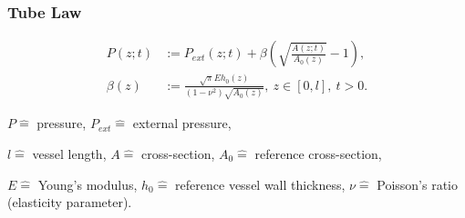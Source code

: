 \documentclass{beamer}
\begin{document}
\begin{frame}
	\frametitle{Tube Law}
	\begin{align}
		P(z;t) &:= P_{ext}(z;t) + \beta \left( \sqrt{\frac{A(z;t)}{A_0(z)}}-1 \right),      \label{eq:p_tot}\\
		\beta(z) &:=  \frac{\sqrt{\pi} E h_0(z)}{(1-\nu^2) \sqrt{A_0(z)}},\  z \in \left[ 0,l \right], \ t > 0. 
	\end{align}

	\vfill

	{\tiny \centering 
		$P \hat{=}$ pressure,
		$P_{ext} \hat{=}$ external pressure,

		$l \hat{=}$ vessel length,
		$A \hat{=}$ cross-section,
		$A_0 \hat{=}$ reference cross-section,

		$E \hat{=}$ Young's modulus,
		$h_0 \hat{=}$ reference vessel wall thickness,
		$\nu \hat{=}$ Poisson's ratio (elasticity parameter). 
	\par}

\end{frame}
\end{document}
